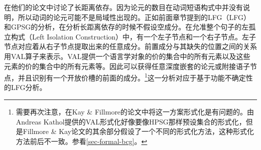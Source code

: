 \mbox{}\citet[\S~3.10]{KF99a}在他们的论文中讨论了长距离依存。因为论元的数目在动词短语构式中并没有说明，所以动词的论元可能不是局域性出现的。正如前面章节提到的LFG\indexlfgc（LFG）和GPSG的分析\indexgpsgc，在分析长距离依存的时候不假设空成分。在允准整个句子的左孤立构式（Left Isolation Construction）中，有一个左子节点和一个右子节点。左子节点对应着从右子节点提取出来的任意成分。前置成分与其缺失的位置之间的关系用VAL算子来表示。VAL提供一个语言学对象的价的集合中的所有元素以及这些元素的价的集合中的所有元素等。因此可以获得任意深度嵌套的论元或附接语子节点，并且识别有一个开放价槽的前面的成分。\footnote{%
   需要再次注意，在Kay \& Fillmore的论文中将这一方案形式化是有问题的。由Andreas Kathol提供的VAL形式化好像要像HPSG那样预设集合的形式化，但是Fillmore \& Kay论文的其余部分假设了一个不同的形式化方法，这种形式化方法前后不一致。参看\ref{sec-formal-bcg}。
 }这一分析对应于\citet{KZ89a}基于功能不确定性的LFG分析。%

